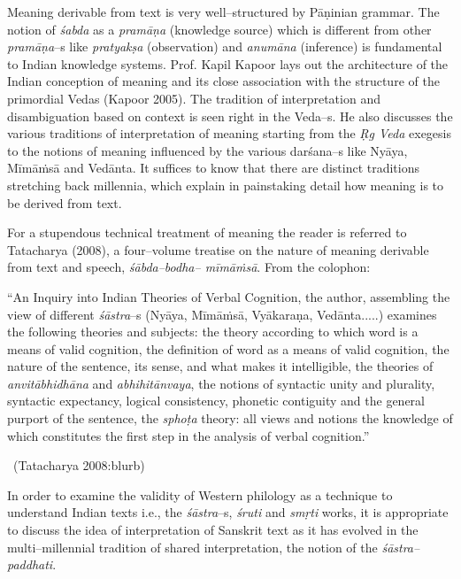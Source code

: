 Meaning derivable from text is very well–structured by Pāṇinian grammar. The notion of \textit{śabda} as a \textit{pramāṇa} (knowledge source) which is different from other \textit{pramāṇa}–s like \textit{pratyakṣa} (observation) and \textit{anumāna} (inference) is fundamental to Indian knowledge systems. Prof. Kapil Kapoor lays out the architecture of the Indian conception of meaning and its close association with the structure of the primordial Vedas (Kapoor 2005). The tradition of interpretation and disambiguation based on context is seen right in the Veda–s. He also discusses the various traditions of interpretation of meaning starting from the \textit{Ṛg Veda} exegesis to the notions of meaning influenced by the various darśana–s like Nyāya, Mīmāṁsā and Vedānta. It suffices to know that there are distinct traditions stretching back millennia, which explain in painstaking detail how meaning is to be derived from text.

For a stupendous technical treatment of meaning the reader is referred to Tatacharya (2008), a four–volume treatise on the nature of meaning derivable from text and speech, \textit{śābda–bodha– mīmāṁsā}. From the colophon:

\begin{myquote}
“An Inquiry into Indian Theories of Verbal Cognition, the author, assembling the view of different \textit{śāstra}–s (Nyāya, Mīmāṁsā, Vyākaraṇa, Vedānta.....) examines the following theories and subjects: the theory according to which word is a means of valid cognition, the definition of word as a means of valid cognition, the nature of the sentence, its sense, and what makes it intelligible, the theories of \textit{anvitābhidhāna} and \textit{abhihitānvaya}, the notions of syntactic unity and plurality, syntactic expectancy, logical consistency, phonetic contiguity and the general purport of the sentence, the \textit{sphoṭa} theory: all views and notions the knowledge of which constitutes the first step in the analysis of verbal cognition.”

~\hfill (Tatacharya 2008:blurb)
\end{myquote}

In order to examine the validity of Western philology as a technique to understand Indian texts i.e., the \textit{śāstra}–s, \textit{śruti} and \textit{smṛti} works, it is appropriate to discuss the idea of interpretation of Sanskrit text as it has evolved in the multi–millennial tradition of shared interpretation, the notion of the \textit{śāstra–paddhati}.

